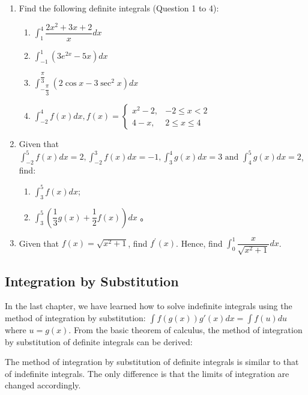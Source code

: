 \documentclass{report}
\begin{document}
\begin{enumerate}
    \item Find the following definite integrals (Question 1 to 4):
          \begin{enumerate}
              \item $\displaystyle\int_1^4 \dfrac{2 x^2+3 x+2}{x} d x$
              \item $\displaystyle\int_{-1}^1\left(3 e^{2 x}-5 x\right) d x$
              \item $\displaystyle\int_{-\dfrac{\pi}{3}}^{\dfrac{\pi}{3}}\left(2 \cos x-3 \sec ^2 x\right) d x$
              \item $\displaystyle\int_{-2}^4 f(x) d x, f(x)=\left\{\begin{array}{cc}x^2-2, & -2 \leq x<2 \\ 4-x, & 2 \leq x \leq 4\end{array}\right.$
          \end{enumerate}
    \item Given that $\displaystyle\int_{-2}^5 f(x) d x=2, \displaystyle\int_{-2}^3 f(x)
              d x=-1, \displaystyle\int_3^4 g(x) d x=3 \text { and } \displaystyle\int_4^5
              g(x) d x=2$, find:
          \begin{enumerate}
              \item $\displaystyle\int_3^5 f(x) d x$;
              \item $\displaystyle\int_3^5\left(\dfrac{1}{3} g(x)+\dfrac{1}{2} f(x)\right) d x$ 。
          \end{enumerate}
    \item Given that $f(x)=\sqrt{x^2+1}$, find $f^{\prime}(x)$. Hence, find
          $\displaystyle\int_0^1 \dfrac{x}{\sqrt{x^2+1}} d x$.
\end{enumerate}

\subsection*{Integration by Substitution}

In the last chapter, we have learned how to solve indefinite integrals using
the method of integration by substitution: $\displaystyle\int f(g(x))g'(x)dx =
    \int f(u)du$ where $u = g(x)$. From the basic theorem of calculus, the method
of integration by substitution of definite integrals can be derived:
\begin{center}
\end{center}
\vspace{0.9em}
The method of integration by substitution of definite integrals is similar to
that of indefinite integrals. The only difference is that the limits of
integration are changed accordingly.
\end{document}
